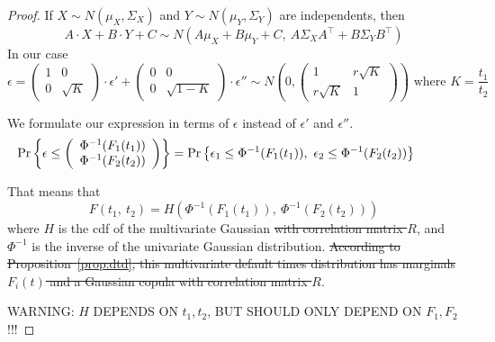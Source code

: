 \documentclass[11pt,fleqn]{book} %
\begin{document}
\begin{proof}
	If $X \sim N(\mu_X,\Sigma_X)$ and $Y \sim N(\mu_Y,\Sigma_Y)$ are independents, then 
	\begin{displaymath}
		A \cdot X + B \cdot Y + C \sim N\left(A \mu_X+ B \mu_Y + C,\ A \Sigma_X A^\intercal + B \Sigma_Y B^\intercal\right)
	\end{displaymath}
	In our case
	\begin{displaymath}
		\epsilon = 
		\left(
			\begin{array}{cc}
				1 & 0 \\ 
				0 & \sqrt{K}
			\end{array}
		\right) 
		\cdot \epsilon' + 
		\left(
			\begin{array}{cc}
				0 & 0 \\ 
				0 & \sqrt{1-K}
			\end{array}
		\right)
		\cdot \epsilon''
		\sim
		N\left(0,\left(
			\begin{array}{cc}
				1   & r \sqrt{K} \\ 
				r \sqrt{K} & 1
			\end{array}
		\right)\right)
		\text{ where }
		K = \frac{t_1}{t_2}
	\end{displaymath}

	We formulate our expression in terms of $\epsilon$ instead of $\epsilon'$ 
	and $\epsilon''$.
	\begin{displaymath}
		\hspace*{-1cm}
		\Pr\left\{ 
		\epsilon
		\le \left(
		\begin{array}{l}
			\Phi^{-1}(F_1(t_1))
			\\
			\Phi^{-1}(F_2(t_2))
		\end{array}
		\right)
		\right\} = 
		\Pr\left\{ 
			\epsilon_1 \le \Phi^{-1}(F_1(t_1)),
			\ \epsilon_2 \le \Phi^{-1}(F_2(t_2))
		\right\}
	\end{displaymath}
	
	
	That means that
	\begin{displaymath}
		F(t_1,\ t_2) = H\left( \Phi^{-1}(F_1(t_1)),\ \Phi^{-1}(F_2(t_2)) \right)
	\end{displaymath}
	where $H$ is the cdf of the multivariate Gaussian \sout{with correlation matrix $R$},
	and $\Phi^{-1}$ is the inverse of the univariate Gaussian distribution.
	\sout{According to Proposition~\ref{prop:dtd}, this multivariate default times 
	distribution has marginals $F_i(t)$ and a Gaussian copula with correlation 
	matrix $R$}.
	
	WARNING: $H$ DEPENDS ON $t_1,t_2$, BUT SHOULD ONLY DEPEND ON $F_1, F_2$ !!!
	
\end{proof}
\end{document}
